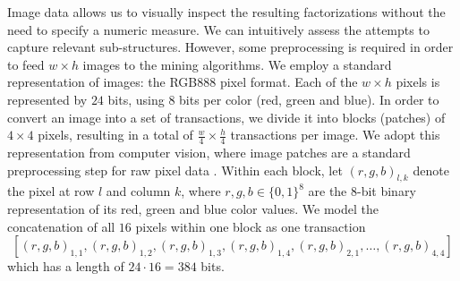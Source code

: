 Image data allows us to visually inspect the resulting factorizations without the need to specify a numeric measure. We can intuitively assess the attempts to capture relevant sub-structures. 
However, some preprocessing is required in order to feed $w \times h$ images to the mining algorithms. 
We employ a standard representation of images: the RGB888 pixel format. Each of the $w \times h$ pixels is represented by $24$ bits, using $8$ bits per color (red, green and blue). 
In order to convert an image into a set of transactions, we divide it into blocks (patches) of $4 \times 4$ pixels, resulting in a total of $\frac{w}{4} \times \frac{h}{4}$ transactions per image. We adopt this representation from computer vision, where image patches are a standard preprocessing step for raw pixel data \citep{jarrett2009what}.
Within each block, let $(r,g,b)_{l,k}$ denote the pixel at row $l$ and column $k$, where $r,g,b\in\{0,1\}^8$ are the $8$-bit binary representation of its red, green and blue color values.
We model the concatenation of all $16$ pixels within one block as one transaction
\begin{equation}
\left[(r,g,b)_{1,1},(r,g,b)_{1,2},(r,g,b)_{1,3},(r,g,b)_{1,4},(r,g,b)_{2,1},\dots,(r,g,b)_{4,4}\right]
\end{equation}
which has a length of $24\cdot 16=384$ bits. 

